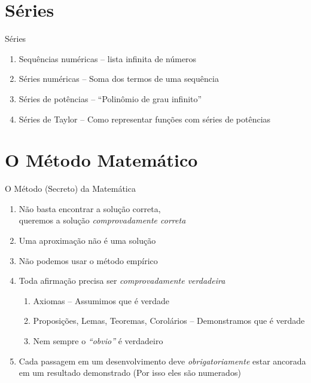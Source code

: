 \section{Séries}

\begin{frame}{Séries}
  \begin{enumerate}[<+->]
    \item Sequências numéricas \tabto{40mm} -- lista infinita de números
    \item Séries numéricas     \tabto{40mm} -- Soma dos termos de uma sequência
    \item Séries de potências  \tabto{40mm} -- ``Polinômio de grau infinito''
    \item Séries de Taylor     \tabto{40mm} -- Como representar funções com séries de potências
  \end{enumerate}
\end{frame}

\section{O Método Matemático}

\begin{frame}{O Método (Secreto) da Matemática}
  \begin{enumerate}[<+->]
    \item Não basta encontrar a solução correta, \\ queremos a solução \emph{comprovadamente correta}
    \item Uma aproximação não é uma solução
    \item Não podemos usar o método empírico
    \item Toda afirmação precisa ser \emph{comprovadamente verdadeira}
    \begin{enumerate}
      \item Axiomas -- Assumimos que é verdade
      \item Proposições, Lemas, Teoremas, Corolários -- Demonstramos que é verdade
      \item Nem sempre o \textit{``obvio''} é verdadeiro
    \end{enumerate}
    \item Cada passagem em um desenvolvimento deve \emph{obrigatoriamente}
    estar ancorada em um resultado demonstrado (Por isso eles são numerados)
  \end{enumerate}
\end{frame}

\begin{frame}
  \tableofcontents
\end{frame}


